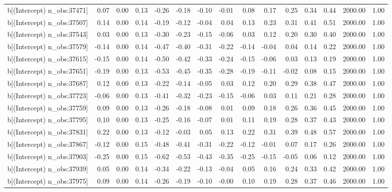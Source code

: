\begin{table}[ht]
\begin{tabular}{rrrrrrrrrrrrrrr}
  b[(Intercept) n\_obs:37471] & 0.07 & 0.00 & 0.13 & -0.26 & -0.18 & -0.10 & -0.01 & 0.08 & 0.17 & 0.25 & 0.34 & 0.44 & 2000.00 & 1.00 \\ 
  b[(Intercept) n\_obs:37507] & 0.14 & 0.00 & 0.14 & -0.19 & -0.12 & -0.04 & 0.04 & 0.13 & 0.23 & 0.31 & 0.41 & 0.51 & 2000.00 & 1.00 \\ 
  b[(Intercept) n\_obs:37543] & 0.03 & 0.00 & 0.13 & -0.30 & -0.23 & -0.15 & -0.06 & 0.03 & 0.12 & 0.20 & 0.30 & 0.40 & 2000.00 & 1.00 \\ 
  b[(Intercept) n\_obs:37579] & -0.14 & 0.00 & 0.14 & -0.47 & -0.40 & -0.31 & -0.22 & -0.14 & -0.04 & 0.04 & 0.14 & 0.22 & 2000.00 & 1.00 \\ 
  b[(Intercept) n\_obs:37615] & -0.15 & 0.00 & 0.14 & -0.50 & -0.42 & -0.33 & -0.24 & -0.15 & -0.06 & 0.03 & 0.13 & 0.19 & 2000.00 & 1.00 \\ 
  b[(Intercept) n\_obs:37651] & -0.19 & 0.00 & 0.13 & -0.53 & -0.45 & -0.35 & -0.28 & -0.19 & -0.11 & -0.02 & 0.08 & 0.15 & 2000.00 & 1.00 \\ 
  b[(Intercept) n\_obs:37687] & 0.12 & 0.00 & 0.13 & -0.22 & -0.14 & -0.05 & 0.03 & 0.12 & 0.20 & 0.29 & 0.38 & 0.47 & 2000.00 & 1.00 \\ 
  b[(Intercept) n\_obs:37723] & -0.06 & 0.00 & 0.13 & -0.41 & -0.32 & -0.23 & -0.15 & -0.06 & 0.03 & 0.11 & 0.21 & 0.28 & 2000.00 & 1.00 \\ 
  b[(Intercept) n\_obs:37759] & 0.09 & 0.00 & 0.13 & -0.26 & -0.18 & -0.08 & 0.01 & 0.09 & 0.18 & 0.26 & 0.36 & 0.45 & 2000.00 & 1.00 \\ 
  b[(Intercept) n\_obs:37795] & 0.10 & 0.00 & 0.13 & -0.25 & -0.16 & -0.07 & 0.01 & 0.11 & 0.19 & 0.28 & 0.37 & 0.43 & 2000.00 & 1.00 \\ 
  b[(Intercept) n\_obs:37831] & 0.22 & 0.00 & 0.13 & -0.12 & -0.03 & 0.05 & 0.13 & 0.22 & 0.31 & 0.39 & 0.48 & 0.57 & 2000.00 & 1.00 \\ 
  b[(Intercept) n\_obs:37867] & -0.12 & 0.00 & 0.15 & -0.48 & -0.41 & -0.31 & -0.22 & -0.12 & -0.01 & 0.07 & 0.17 & 0.26 & 2000.00 & 1.00 \\ 
  b[(Intercept) n\_obs:37903] & -0.25 & 0.00 & 0.15 & -0.62 & -0.53 & -0.43 & -0.35 & -0.25 & -0.15 & -0.05 & 0.06 & 0.12 & 2000.00 & 1.00 \\ 
  b[(Intercept) n\_obs:37939] & 0.05 & 0.00 & 0.14 & -0.34 & -0.22 & -0.13 & -0.04 & 0.05 & 0.16 & 0.24 & 0.33 & 0.42 & 2000.00 & 1.00 \\ 
  b[(Intercept) n\_obs:37975] & 0.09 & 0.00 & 0.14 & -0.26 & -0.19 & -0.10 & -0.00 & 0.10 & 0.19 & 0.28 & 0.37 & 0.46 & 2000.00 & 1.00 \\ 

\end{tabular}
\end{table}

